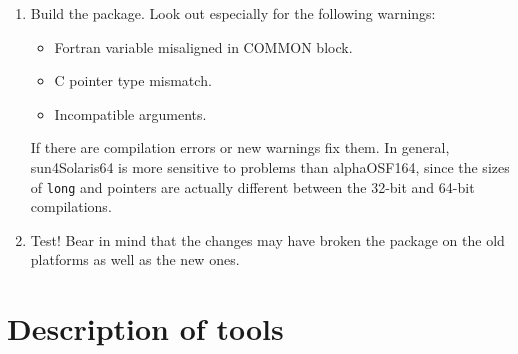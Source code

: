 \documentclass[twoside,11pt]{article}
\newcommand{\html}[1]{}
\renewcommand{\_}{\texttt{\symbol{95}}}
\newcommand{\cc}[1]{{\tt #1}}
\newenvironment{squote}{\begin{quote}\begin{small}}{\end{small}\end{quote}}
\begin{document}
\begin{enumerate}
\html{\begin{squote}\end{squote}}
%
\item
Build the package.  Look out especially for the following warnings:
\begin{itemize}
\item Fortran variable misaligned in COMMON block.
\item C pointer type mismatch.
\item Incompatible arguments.
\end{itemize}
If there are compilation errors or new warnings fix them.
In general, sun4\_Solaris\_64 is more sensitive to problems than
alpha\_OSF1\_64, since the sizes of \cc{long} and pointers are 
actually different between the 32-bit and 64-bit compilations.
\html{\begin{squote}\end{squote}}
%
\item Test!  
Bear in mind that 
the changes may have broken the package on the old platforms
as well as the new ones.
\html{\begin{squote}\end{squote}}
%
\end{enumerate}

\appendix

\section{Description of tools\label{sec:commands}}


\end{document}
